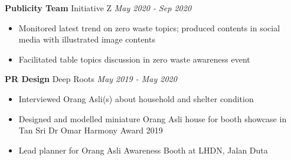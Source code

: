 \documentclass[11pt,A4,english]{article}
\begin{document}
\begin{paracol}{2}
\begin{rightcolumn}
        \vspace{1em}
        
        \begin{addmargin}[0em]{0em}
            {\bfseries Publicity Team} {\bfseries\textbar} Initiative Z \hfill \textit{May 2020 - Sep 2020}\\
            \vspace{-.3cm}
            
            \begin{addmargin}[-.5em]{0em}
                \begin{itemize}
                    \justifying
                    \item Monitored latest trend on zero waste topics; produced contents in social media with illustrated image contents
                    \vspace{-.1cm}
                    \item Facilitated table topics discussion in zero waste awareness event
                    \vspace{-.1cm}
                \end{itemize}
            \end{addmargin}
        \end{addmargin}

        \vspace{1em}

        \begin{addmargin}[0em]{0em}
            {\bfseries PR Design} 
            {\bfseries\textbar}\hspace{1pt} Deep Roots \hfill \vspace{.5em} \textit{May 2019 - May 2020}
            \begin{addmargin}[-.5em]{0em}
                \begin{itemize}
                    \justifying
                    \item Interviewed Orang Asli(s) about household and shelter condition
                    \vspace{-.1cm}
                    \item Designed and modelled miniature Orang Asli house for booth showcase in Tan Sri Dr Omar Harmony Award 2019
                    \vspace{-.1cm}
                    \item Lead planner for Orang Asli Awareness Booth at LHDN, Jalan Duta
                    

\end{itemize}
\end{addmargin}
\end{addmargin}
\end{rightcolumn}
\end{paracol}
\end{document}
